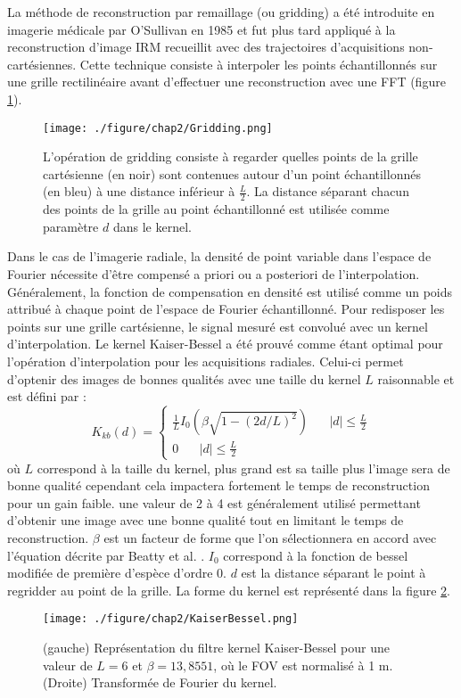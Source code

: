 La méthode de reconstruction par remaillage (ou gridding) a été introduite en imagerie médicale par O'Sullivan en 1985 \cite{o1985fast} et fut plus tard appliqué à la reconstruction d'image IRM recueillit avec des trajectoires d'acquisitions non-cartésiennes. Cette technique consiste à interpoler les points échantillonnés sur une grille rectilinéaire avant d'effectuer une reconstruction avec une FFT (figure \ref{fig:Gridding}).

\begin{figure}[h]
\centering
\texttt{[image: ./figure/chap2/Gridding.png]}
\caption[Gridding]{\label{fig:Gridding} L'opération de gridding consiste à regarder quelles points de la grille cartésienne (en noir) sont contenues autour d'un point échantillonnés (en bleu) à une distance inférieur à $\frac{L}{2}$. La distance séparant chacun des points de la grille au point échantillonné est utilisée comme paramètre $d$ dans le kernel.} 
\end{figure}

Dans le cas de l'imagerie radiale, la densité de point variable dans l'espace de Fourier nécessite d'être compensé a priori ou a posteriori de l'interpolation. Généralement, la fonction de compensation en densité est utilisé comme un poids attribué à chaque point de l'espace de Fourier échantillonné. Pour redisposer les points sur une grille cartésienne, le signal mesuré est convolué avec un kernel d'interpolation. Le kernel Kaiser-Bessel a été prouvé comme étant optimal pour l'opération d'interpolation pour les acquisitions radiales. Celui-ci permet d'optenir des images de bonnes qualités avec une taille du kernel $L$ raisonnable et est défini par :
\begin{equation}
  K_{kb}(d) = \left\{
      \begin{aligned}
         \frac{1}{L}I_0(\beta \sqrt{1-(2d/L)^2}) \;\;\;\;\;\;  |d| \leq \frac{L}{2}\\
	     0 \;\;\;\;\;\; |d| \leq \frac{L}{2}
      \end{aligned}
    \right.
\end{equation}
où $L$ correspond à la taille du kernel, plus grand est sa taille plus l'image sera de bonne qualité cependant cela impactera fortement le temps de reconstruction pour un gain faible. une valeur de 2 à 4 est généralement utilisé permettant d'obtenir une image avec une bonne qualité tout en limitant le temps de reconstruction. $\beta$ est un facteur de forme  que l'on sélectionnera en accord avec l'équation décrite par Beatty et al. \cite{Beatty:2005fk}. $I_0$ correspond à la fonction de bessel modifiée de première d'espèce d'ordre 0. $d$ est la distance séparant le point à regridder au point de la grille. La forme du kernel est représenté dans la figure \ref{fig:KaiserBessel}.
\begin{figure}[H]
\centering
\texttt{[image: ./figure/chap2/KaiserBessel.png]}
\caption[Kernel Kaiser-Bessel]{\label{fig:KaiserBessel} (gauche) Représentation du filtre kernel Kaiser-Bessel pour une valeur de $L = 6$ et $\beta = 13,8551$, où le FOV est normalisé à 1 m. (Droite) Transformée de Fourier du kernel.}
\end{figure}

